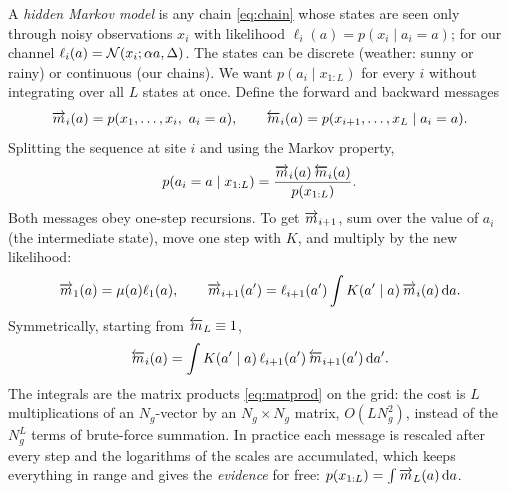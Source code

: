 A \emph{hidden Markov model} is any chain \eqref{eq:chain} whose states are seen only through noisy
observations $x_i$ with likelihood $\ell_i(a)=p(x_i\mid a_i=a)$; for our channel $\ell_i(a)=\mathcal{N}(x_i;\alpha a,\Delta)$.
The states can be discrete (weather: sunny or rainy) or continuous (our chains). We want $p(a_i\mid x_{1:L})$
for every $i$ without integrating over all $L$ states at once. Define the forward and backward messages
\begin{equation}\label{eq:msgdef}
  \overrightarrow{m}_i(a)=p(x_1,\dots,x_i,\ a_i=a),\qquad \overleftarrow{m}_i(a)=p(x_{i+1},\dots,x_L\mid a_i=a).
\end{equation}
Splitting the sequence at site $i$ and using the Markov property,
\begin{equation}\label{eq:posterior}
  p(a_i=a\mid x_{1:L})=\frac{\overrightarrow{m}_i(a)\,\overleftarrow{m}_i(a)}{p(x_{1:L})}.
\end{equation}
Both messages obey one-step recursions. To get $\overrightarrow{m}_{i+1}$, sum over the value of $a_i$ (the intermediate
state), move one step with $K$, and multiply by the new likelihood:
\begin{equation}\label{eq:fwd}
  \overrightarrow{m}_1(a)=\mu(a)\ell_1(a),\qquad \overrightarrow{m}_{i+1}(a')=\ell_{i+1}(a')\int K(a'\mid a)\,\overrightarrow{m}_i(a)\,\mathrm{d} a .
\end{equation}
Symmetrically, starting from $\overleftarrow{m}_L\equiv1$,
\begin{equation}\label{eq:bwd}
  \overleftarrow{m}_i(a)=\int K(a'\mid a)\,\ell_{i+1}(a')\,\overleftarrow{m}_{i+1}(a')\,\mathrm{d} a' .
\end{equation}
The integrals are the matrix products \eqref{eq:matprod} on the grid: the cost is $L$ multiplications of an
$N_g$-vector by an $N_g\times N_g$ matrix, $O(LN_g^2)$, instead of the $N_g^L$ terms of brute-force summation. In
practice each message is rescaled after every step and the logarithms of the scales are accumulated, which
keeps everything in range and gives the \emph{evidence} for free:
$p(x_{1:L})=\int\overrightarrow{m}_L(a)\,\mathrm{d} a$.

